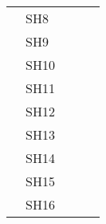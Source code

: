 \documentclass[10pt,letterpaper,oneside]{article}
\begin{document}
\begin{table}[]
\begin{tabular}{lllll}
			& SH8                                  &                                   &                                                        &                                                                                                                                         \\
			& SH9                                  &                                   &                                                        &                                                                                                                                         \\
			& SH10                                 &                                   &                                                        &                                                                                                                                         \\
			& SH11                                 &                                   &                                                        &                                                                                                                                         \\
			& SH12                                 &                                   &                                                        &                                                                                                                                         \\
			& SH13                                 &                                   &                                                        &                                                                                                                                         \\
			& SH14                                 &                                   &                                                        &                                                                                                                                         \\
			& SH15                                 &                                   &                                                        &                                                                                                                                         \\
			& SH16                                 &                                   &                                                        &                                                                                                                                         \\

\end{tabular}
\end{table}
\end{document}
